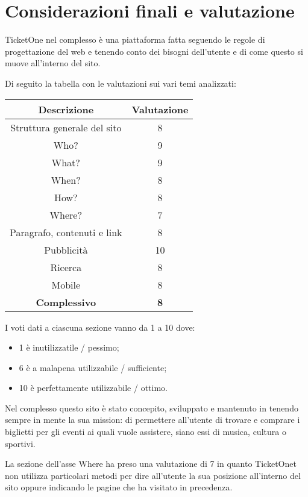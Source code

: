 \section{Considerazioni finali e valutazione}\label{conclusioni}

TicketOne nel complesso è una piattaforma fatta seguendo le regole di progettazione del web e tenendo conto dei bisogni dell'utente e di come questo si muove all'interno del sito.
\par Di seguito la tabella con le valutazioni sui vari temi analizzati:
\begin{center}
	\renewcommand{\arraystretch}{2}
	\setlength{\tabcolsep}{1.3cm} %
    \begin{tabular}{| c | c |}
		\hline
        \textbf{Descrizione} & \textbf{Valutazione} \\
        \hline \hline
        Struttura generale del sito & 8 \\\hline 
        Who? & 9 \\\hline 
        What? & 9 \\\hline 
        When? & 8 \\\hline 
        How? & 8 \\\hline
        Where? & 7 \\\hline 
        Paragrafo, contenuti e link & 8 \\\hline
        Pubblicità & 10 \\\hline 
        Ricerca & 8 \\\hline
        Mobile & 8 \\\hline \hline
        \textbf{Complessivo} & \textbf{8} \\\hline
    \end{tabular}
	\renewcommand{\arraystretch}{1}%
\end{center}
I voti dati a ciascuna sezione vanno da 1 a 10 dove:
\begin{itemize}[noitemsep]
	\item 1 è inutilizzatile / pessimo;
	\item 6 è a malapena utilizzabile / sufficiente;
	\item 10 è perfettamente utilizzabile / ottimo.
\end{itemize}
Nel complesso questo sito è stato concepito, sviluppato e mantenuto in tenendo sempre in mente la sua mission: di permettere all'utente di trovare e comprare i biglietti per gli eventi ai quali vuole assistere, siano essi di musica, cultura o sportivi.
\par La sezione dell'asse Where ha preso una valutazione di 7 in quanto TicketOnet non utilizza particolari metodi per dire all'utente la sua posizione all'interno del sito oppure indicando le pagine che ha visitato in precedenza.
